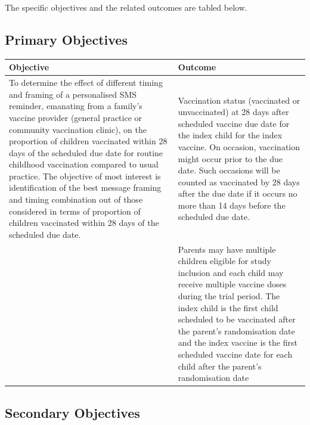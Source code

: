 \documentclass[
  bibliography=totoc]{scrreprt}
\begin{document}
The specific objectives and the related outcomes are tabled below.

\hypertarget{primary-objectives}{%
\subsection{Primary Objectives}\label{primary-objectives}}

\begingroup\fontsize{10}{12}\selectfont

\begin{tabu} to 
\toprule
Objective & Outcome\\
\midrule
To determine the effect of different timing and framing of a personalised SMS reminder, emanating from a family’s vaccine provider (general practice or community vaccination clinic), on the proportion of children vaccinated within 28 days of the scheduled due date for routine childhood vaccination compared to usual practice.
The objective of most interest is identification of the best message framing and timing combination out of those considered in terms of proportion of children vaccinated within 28 days of the scheduled due date. & Vaccination status (vaccinated or unvaccinated) at 28 days after scheduled vaccine due date for the index child for the index vaccine. On occasion, vaccination might occur prior to the due date. Such occasions will be counted as vaccinated by 28 days after the due date if it occurs no more than 14 days before the scheduled due date.\\
 & Parents may have multiple children eligible for study inclusion and each child may receive multiple vaccine doses during the trial period. The index child is the first child scheduled to be vaccinated after the parent’s randomisation date and the index vaccine is the first scheduled vaccine date for each child after the parent’s randomisation date\\
\bottomrule
\end{tabu}
\endgroup{}

\hypertarget{secondary-objectives}{%
\subsection{Secondary Objectives}\label{secondary-objectives}}

\begingroup\fontsize{10}{12}\selectfont
\end{document}
